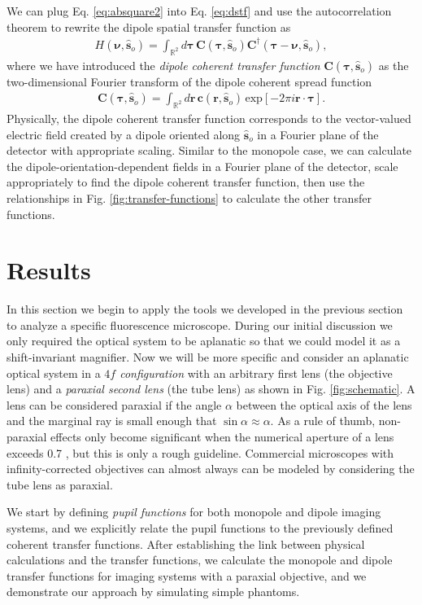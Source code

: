 \documentclass[]{osa-article}
\providecommand{\mb}[1]{\mathbf{#1}}
\providecommand{\so}{\mathbf{\hat{s}}_o}
\providecommand{\mbb}[1]{\mathbb{#1}}
\providecommand{\bs}[1]{\boldsymbol{#1}}
\providecommand{\bv}{\bs{\nu}}
\providecommand{\taup}{\bs{\tau}}
\begin{document}
We can plug Eq. \eqref{eq:absquare2} into Eq. \eqref{eq:dstf} and use the
autocorrelation theorem to rewrite the dipole spatial transfer function as
\begin{align}
  H(\bv, \so) = \int_{\mbb{R}^2}d\taup\,\mb{C}(\taup, \so)\mb{C}^\dagger(\taup - \bv, \so), 
\end{align}
where we have introduced the \textit{dipole coherent transfer function}
$\mb{C}(\taup, \so)$ as the two-dimensional Fourier transform of the dipole
coherent spread function
\begin{align}
  \mb{C}(\taup, \so) = \int_{\mbb{R}^2}d\mb{r}\, \mb{c}(\mb{r}, \so)\,\text{exp}[-2\pi i\mb{r}\cdot\taup].
\end{align}
Physically, the dipole coherent transfer function corresponds to the
vector-valued electric field created by a dipole oriented along $\so$ in a
Fourier plane of the detector with appropriate scaling. Similar to the monopole
case, we can calculate the dipole-orientation-dependent fields in a Fourier plane of
the detector, scale appropriately to find the dipole coherent transfer function,
then use the relationships in Fig. \ref{fig:transfer-functions} to calculate
the other transfer functions. 

\section{Results}\label{sec:results}
In this section we begin to apply the tools we developed in the previous section
to analyze a specific fluorescence microscope. During our initial discussion we
only required the optical system to be aplanatic so that we could model it as a
shift-invariant magnifier. Now we will be more specific and consider an
aplanatic optical system in a \textit{$\mathit{4}f$ configuration} with an
arbitrary first lens (the objective lens) and a \textit{paraxial second lens}
(the tube lens) as shown in Fig. \ref{fig:schematic}. A lens can be considered
paraxial if the angle $\alpha$ between the optical axis of the lens and the
marginal ray is small enough that $\sin\alpha \approx \alpha$. As a rule of
thumb, non-paraxial effects only become significant when the numerical aperture
of a lens exceeds 0.7 \cite[ch.~6]{gu2000}, but this is only a rough
guideline. Commercial microscopes with infinity-corrected objectives can almost
always can be modeled by considering the tube lens as paraxial. 

We start by defining \textit{pupil functions} for both monopole and dipole
imaging systems, and we explicitly relate the pupil functions to the previously
defined coherent transfer functions. After establishing the link between
physical calculations and the transfer functions, we calculate the monopole and
dipole transfer functions for imaging systems with a paraxial objective, and we
demonstrate our approach by simulating simple phantoms. 
\end{document}
